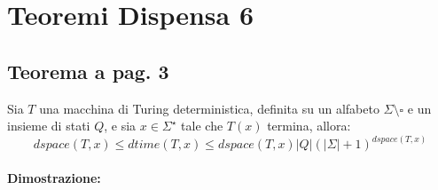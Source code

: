 \section{Teoremi Dispensa 6}

\subsection{Teorema a pag. 3}

Sia $T$ una macchina di Turing deterministica, definita su un alfabeto $\Sigma \setminus \square$ e 
un insieme di stati $Q$, e sia $x\in \Sigma^{\star}$ tale che $T(x)$ termina, allora: 
$$dspace(T, x) \leq dtime(T, x) \leq dspace(T, x)|Q|(|\Sigma| + 1)^{dspace(T, x)}$$

\paragraph*{Dimostrazione:} 
